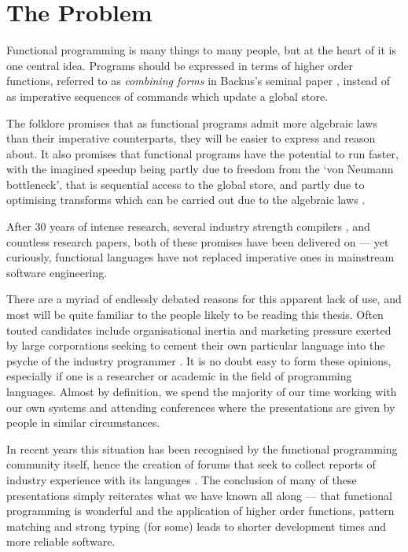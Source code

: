 \clearpage{}
\section{The Problem}
Functional programming is many things to many people, but at the heart of it is one central idea. Programs should be expressed in terms of higher order functions, referred to as \emph{combining forms} in Backus's seminal paper \cite{backus:liberate}, instead of as imperative sequences of commands which update a global store.

The folklore promises that as functional programs admit more algebraic laws than their imperative counterparts, they will be easier to express and reason about. It also promises that functional programs have the potential to run faster, with the imagined speedup being partly due to freedom from the `von Neumann bottleneck', that is sequential access to the global store, and partly due to optimising transforms which can be carried out due to the algebraic laws \cite{santos:compilation}. 

After 30 years of intense research, several industry strength compilers \cite{peyton-jones:compilation-by-transformation, nocker:clean, tofte:mlkit-4.3.0, macqueen:sml}, and countless research papers, both of these promises have been delivered on --- yet curiously, functional languages have not replaced imperative ones in mainstream software engineering.

There are a myriad of endlessly debated reasons for this apparent lack of use, and most will be quite familiar to the people likely to be reading this thesis. Often touted candidates include organisational inertia and marketing pressure exerted by large corporations seeking to cement their own particular language into the psyche of the industry programmer \cite{gosling:java-standard}. It is no doubt easy to form these opinions, especially if one is a researcher or academic in the field of programming languages. Almost by definition, we spend the majority of our time working with our own systems and attending conferences where the presentations are given by people in similar circumstances.

In recent years this situation has been recognised by the functional programming community itself, hence the creation of forums that seek to collect reports of industry experience with its languages \cite{wadler:cufp}. The conclusion of many of these presentations simply reiterates what we have known all along --- that functional programming is wonderful and the application of higher order functions, pattern matching and strong typing (for some) leads to shorter development times and more reliable software.

